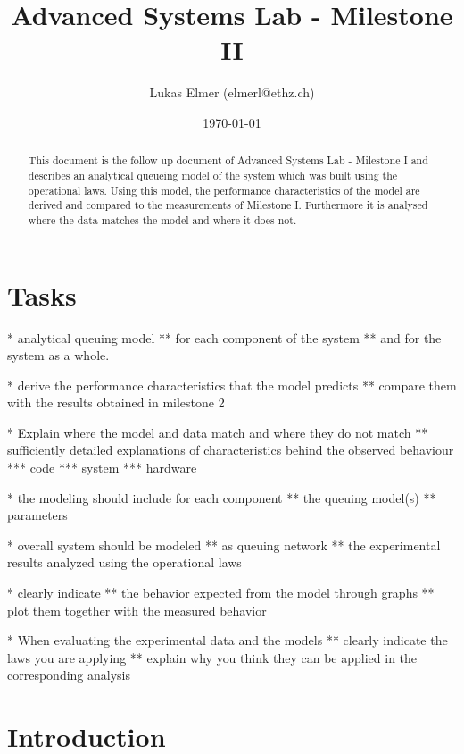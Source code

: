 \documentclass[a4paper]{article}
\title{Advanced Systems Lab - Milestone II}
\author{Lukas Elmer (elmerl@ethz.ch)}
\date{\today}
\begin{document}
\maketitle

\pagebreak

\tableofcontents

\pagebreak

\begin{abstract}

This document is the follow up document of Advanced Systems Lab - Milestone I and describes an analytical queueing model of the system which was built using the operational laws. Using this model, the performance characteristics of the model are derived and compared to the measurements of Milestone I. Furthermore it is analysed where the data matches the model and where it does not.

\end{abstract}

\pagebreak

\section{Tasks}

* analytical queuing model
** for each component of the system
** and for the system as a whole.

* derive the performance characteristics that the model predicts
** compare them with the results obtained in milestone 2

* Explain where the model and data match and where they do not match
** sufficiently detailed explanations of characteristics behind the observed behaviour
*** code
*** system
*** hardware

* the modeling should include for each component
** the queuing model(s)
** parameters

* overall system should be modeled
** as queuing network
** the experimental results analyzed using the operational laws

* clearly indicate
** the behavior expected from the model through graphs
** plot them together with the measured behavior

* When evaluating the experimental data and the models
** clearly indicate the laws you are applying
** explain why you think they can be applied in the corresponding analysis


\section{Introduction}
\end{document}
